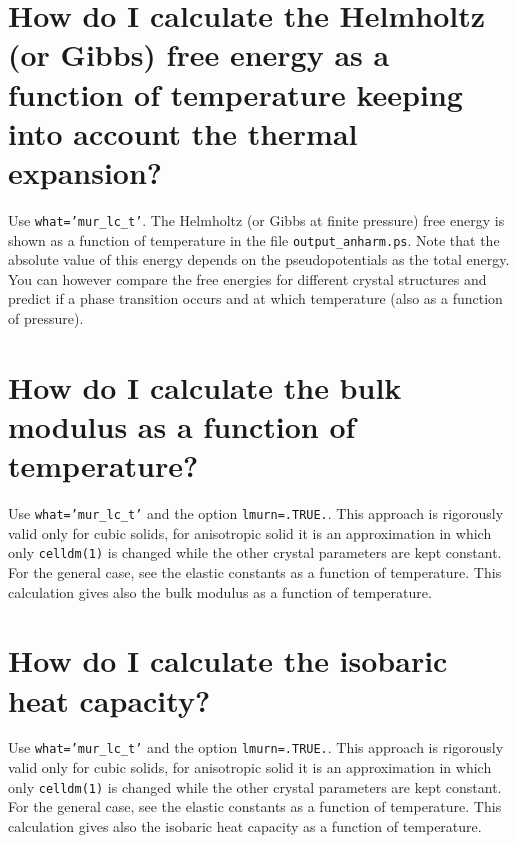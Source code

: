 \documentclass[12pt,a4paper,twoside]{report}
\begin{document}
\newpage
{\color{coral}\section{How do I calculate the Helmholtz (or Gibbs) free energy
as a function of temperature keeping into account the thermal expansion?}}
\color{black}
Use \texttt{what='mur\_lc\_t'}. The Helmholtz (or Gibbs at finite pressure) 
free energy is shown as a function of temperature in the file 
\texttt{output\_anharm.ps}. Note that the absolute value of this energy
depends on the pseudopotentials as the total energy. You can however
compare the free energies for different crystal structures 
and predict if a phase transition occurs and at which temperature (also 
as a function of pressure).

\newpage
{\color{coral}\section{How do I calculate the bulk modulus as a function of 
temperature?}}
\color{black}
Use \texttt{what='mur\_lc\_t'} and the option \texttt{lmurn=.TRUE.}.
This approach is rigorously valid only for cubic solids, for anisotropic
solid it is an approximation in which only \texttt{celldm(1)} is
changed while the other crystal parameters are kept constant. 
For the general case, see the elastic constants as a function of 
temperature. This calculation gives also the bulk modulus as a function 
of temperature.

\newpage
{\color{coral}\section{How do I calculate the isobaric heat capacity?}}
\color{black}
Use \texttt{what='mur\_lc\_t'} and the option \texttt{lmurn=.TRUE.}.
This approach is rigorously valid only for cubic solids, for anisotropic
solid it is an approximation in which only \texttt{celldm(1)} is
changed while the other crystal parameters are kept constant.
For the general case, see the elastic constants
as a function of temperature. This calculation gives also the 
isobaric heat capacity as a function of temperature.
\end{document}
